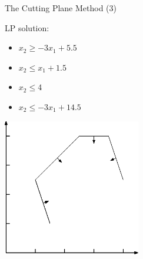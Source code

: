 \documentclass[10pt]{beamer}
\begin{document}
\begin{frame}[t]{The Cutting Plane Method (3)}
        \begin{minipage}[t]{0.48\textwidth}
            LP solution:        
            \begin{itemize}
                \item $ x_2 \geq -3x_1 + 5.5 $
                \item $ x_2 \leq x_1 + 1.5 $
                \item $ x_2 \leq 4$
                \item $ x_2 \leq -3x_1 + 14.5 $
            \end{itemize}
        \end{minipage}
        \begin{minipage}[t]{0.48\textwidth}
            \begin{center}
                \includegraphics[width=6cm]{cutting_plane004.eps} 
            \end{center}
        \end{minipage}        
\end{frame}
\end{document}
